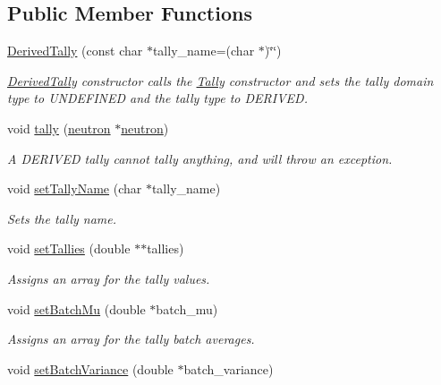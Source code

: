 \subsection*{Public Member Functions}
\begin{DoxyCompactItemize}
\item 
\hyperlink{classDerivedTally_a09be94ac5d5d7c0d55cbbbaf48d3585f}{Derived\-Tally} (const char $\ast$tally\-\_\-name=(char $\ast$)\char`\"{}\char`\"{})
\begin{DoxyCompactList}\small\item\em \hyperlink{classDerivedTally}{Derived\-Tally} constructor calls the \hyperlink{classTally}{Tally} constructor and sets the tally domain type to U\-N\-D\-E\-F\-I\-N\-E\-D and the tally type to D\-E\-R\-I\-V\-E\-D. \end{DoxyCompactList}\item 
void \hyperlink{classDerivedTally_a80e9a372015c142cdc74d38b7f281166}{tally} (\hyperlink{structneutron}{neutron} $\ast$\hyperlink{structneutron}{neutron})
\begin{DoxyCompactList}\small\item\em A D\-E\-R\-I\-V\-E\-D tally cannot tally anything, and will throw an exception. \end{DoxyCompactList}\item 
void \hyperlink{classDerivedTally_ab301c71d0c9a36ed455766e5af701398}{set\-Tally\-Name} (char $\ast$tally\-\_\-name)
\begin{DoxyCompactList}\small\item\em Sets the tally name. \end{DoxyCompactList}\item 
void \hyperlink{classDerivedTally_acf9dad27dba5dcbdc598be384c69fa4a}{set\-Tallies} (double $\ast$$\ast$tallies)
\begin{DoxyCompactList}\small\item\em Assigns an array for the tally values. \end{DoxyCompactList}\item 
void \hyperlink{classDerivedTally_a6aabaf89a60ba07a1460518fcbea7990}{set\-Batch\-Mu} (double $\ast$batch\-\_\-mu)
\begin{DoxyCompactList}\small\item\em Assigns an array for the tally batch averages. \end{DoxyCompactList}\item 
void \hyperlink{classDerivedTally_ac70f57c64cea0638308dde7dad25c5d1}{set\-Batch\-Variance} (double $\ast$batch\-\_\-variance)
$$
\end{DoxyCompactItemize}
